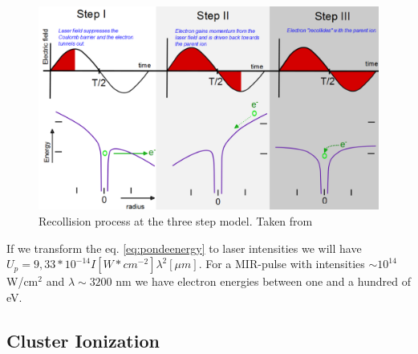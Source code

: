 \begin{figure}[h!]
\centering
\includegraphics[width=12 cm]{../Images/ponderomotive steps.png}
\caption[Ponderomotive 3 steps]{Recollision  process at the three step model. Taken from \cite{krishnan_doped_2011}}
\label{fig:ponder}
\end{figure}


If we transform the eq. \ref{eq:pondeenergy} to laser intensities we will have $U_{p} = 9,33*10^{-14} I[W*cm^{-2}] \lambda^{2}[\mu m]$. For a MIR-pulse with intensities $\sim 10^{14}$ W/cm$^{2}$ and $\lambda \sim 3200$ nm we have electron energies between one and a hundred of eV.

\subsection{Cluster Ionization}

